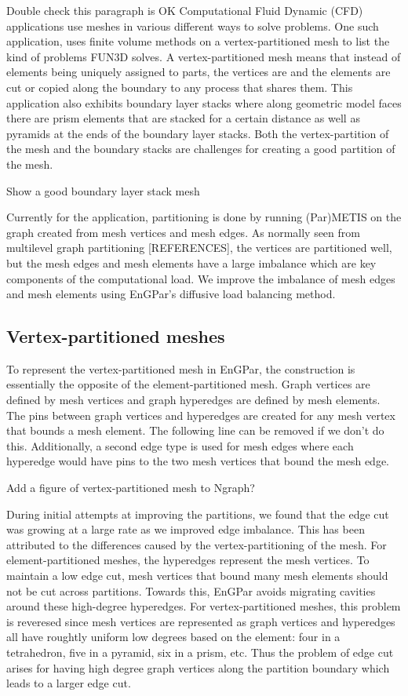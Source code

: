 \documentclass[conference]{IEEEtran}
\begin{document}
{\color{red} Double check this paragraph is OK}
Computational Fluid Dynamic (CFD) applications use meshes in various different ways to solve
problems. One such application, uses finite volume methods on a vertex-partitioned mesh to
{\color{red} list the kind of problems FUN3D solves}. A vertex-partitioned mesh means that
instead of elements being uniquely assigned to parts, the vertices are and the elements are
cut or copied along the boundary to any process that shares them. This application also exhibits
boundary layer stacks where along geometric model faces there are prism elements that are stacked
for a certain distance as well as pyramids at the ends of the boundary layer stacks. Both the
vertex-partition of the mesh and the boundary stacks are challenges for creating a good partition
of the mesh.

{\color{red} Show a good boundary layer stack mesh}

Currently for the application, partitioning is done by running (Par)METIS on the graph created
from mesh vertices and mesh edges. As normally seen from multilevel graph
partitioning [REFERENCES],
the vertices are partitioned well, but the mesh edges and mesh elements have a large
imbalance which are key components of the computational load. We improve the imbalance of
mesh edges and mesh elements using EnGPar's diffusive load balancing method.

\subsection{Vertex-partitioned meshes}

To represent the vertex-partitioned mesh in EnGPar, the construction
is essentially the opposite of the element-partitioned mesh. Graph
vertices are defined by mesh vertices and graph hyperedges are defined
by mesh elements. The pins between graph vertices and hyperedges are
created for any mesh vertex that bounds a mesh element.
{\color{red} The following line can be removed if we don't do this.}
Additionally, a second edge type is used for mesh edges where each
hyperedge would have pins to the two mesh vertices that bound the mesh edge.

{\color{red} Add a figure of vertex-partitioned mesh to Ngraph?}

During initial attempts at improving the partitions, we found that the edge cut was growing
at a large rate as we improved edge imbalance. This has been attributed to the differences
caused by the vertex-partitioning of the mesh. For element-partitioned meshes, the hyperedges
represent the mesh vertices. To maintain a low edge cut, mesh vertices that bound many mesh
elements should not be cut across partitions. Towards this, EnGPar avoids migrating cavities
around these high-degree hyperedges. For vertex-partitioned meshes, this problem is reveresed
since mesh vertices are represented as graph vertices and hyperedges all have roughtly uniform
low degrees based on the element: four in a tetrahedron, five in a pyramid, six in a prism, etc.
Thus the problem of edge cut arises for having high degree graph vertices along the partition
boundary which leads to a larger edge cut.
\end{document}

